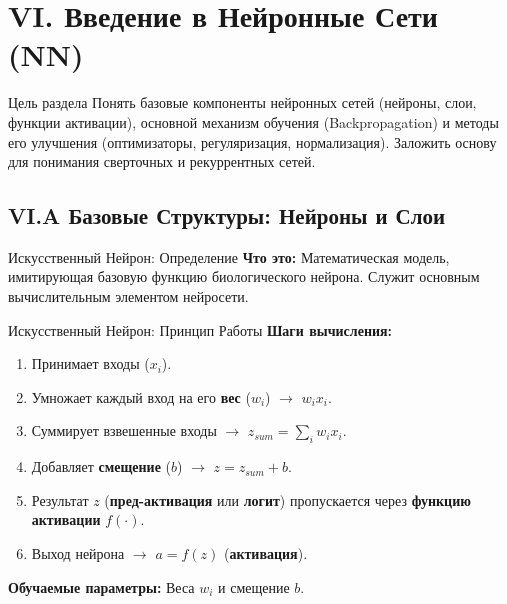 \section{VI. Введение в Нейронные Сети (NN)}

\begin{textbox}{Цель раздела}
    Понять базовые компоненты нейронных сетей (нейроны, слои, функции активации), основной механизм обучения (Backpropagation) и методы его улучшения (оптимизаторы, регуляризация, нормализация). Заложить основу для понимания сверточных и рекуррентных сетей.
\end{textbox}

\subsection{VI.A Базовые Структуры: Нейроны и Слои}

\begin{myblock}{Искусственный Нейрон: Определение}
    \textbf{Что это:} Математическая модель, имитирующая базовую функцию биологического нейрона. Служит основным вычислительным элементом нейросети.
\end{myblock}

\begin{myexampleblock}{Искусственный Нейрон: Принцип Работы}
    \textbf{Шаги вычисления:}
    \begin{enumerate}[nosep, itemsep=0.5ex]
        \item Принимает входы ($x_i$).
        \item Умножает каждый вход на его \textbf{вес} ($w_i$) $\rightarrow$ $w_i x_i$.
        \item Суммирует взвешенные входы $\rightarrow$ $z_{sum} = \sum_{i} w_i x_i$.
        \item Добавляет \textbf{смещение} ($b$) $\rightarrow$ $z = z_{sum} + b$.
        \item Результат $z$ (\textbf{пред-активация} или \textbf{логит}) пропускается через \textbf{функцию активации} $f(\cdot)$.
        \item Выход нейрона $\rightarrow$ $a = f(z)$ (\textbf{активация}).
    \end{enumerate}
    \textbf{Обучаемые параметры:} Веса $w_i$ и смещение $b$.
\end{myexampleblock}

